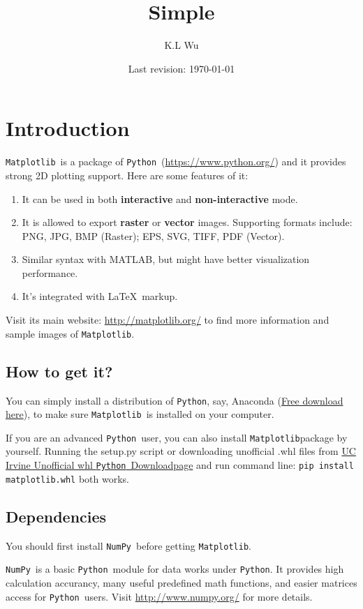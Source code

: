 \documentclass{report}
\title{Simple \mpl}
\author{K.L Wu}
\date{Last revision: \today}
\newcommand{\pkg}[1]{\texttt{#1}}
\newcommand{\Py}{\pkg{Python}}
\newcommand{\NumPy}{\pkg{NumPy}}
\newcommand{\mpl}{\texttt{Matplotlib}}
\newcommand{\Emph}[1]{\textcolor{cyan!80!white}{{\bfseries #1}}}
\begin{document}
\maketitle

\chapter{Introduction}
\mpl\ is a package of \Py\ (\url{https://www.python.org/}) and it provides strong 2D plotting support. Here are some features of it:
\begin{enumerate}
\item It can be used in both \Emph{interactive} and \Emph{non-interactive} mode.
\item It is allowed to export \Emph{raster} or \Emph{vector} images. Supporting formats include: PNG, JPG, BMP (Raster); EPS, SVG, TIFF, PDF (Vector).
\item Similar syntax with MATLAB, but might have better visualization performance.
\item It's integrated with \LaTeX\ markup.
\end{enumerate}

Visit its main website: \url{http://matplotlib.org/} to find more information and sample images of \mpl .

\section{How to get it?}
You can simply install a distribution of \Py, say, Anaconda (\href{https://www.continuum.io/downloads}{Free download here}), to make sure \mpl\ is installed on your computer. 

If you are an advanced \Py\ user, you can also install \mpl package by yourself. Running the setup.py script or downloading unofficial .whl files from \href{http://www.lfd.uci.edu/~gohlke/pythonlibs/#matplotlib}{UC Irvine Unofficial whl \Py\ Downloadpage} and run command line: \texttt{pip install matplotlib.whl} both works.

\section{Dependencies}
You should first install \NumPy\ before getting \mpl .

\NumPy\ is a basic \Py\ module for data works under \Py . It provides high calculation accurancy, many useful predefined math functions, and easier matrices access for \Py\ users. Visit \url{http://www.numpy.org/} for more details.
\end{document}
